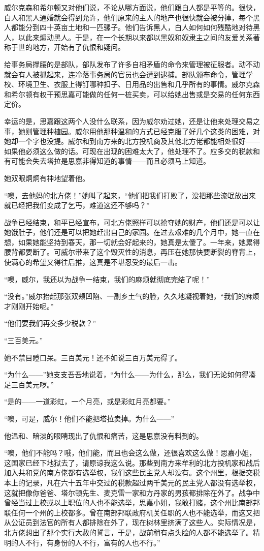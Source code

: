 \par 威尔克森和希尔顿又对他们说，不论从哪方面说，他们跟白人都是平等的。很快，白人和黑人通婚就会得到允许，他们原来的主人的地产也很快就会被分掉，每个黑人都能分到四十英亩土地和一匹骡子。他们告诉黑人，白人如何如何残酷地对待黑人，以此来煽动黑人。于是，在一个长期以来都以黑奴和奴隶主之间的友爱关系著称于世的地方，开始有了仇恨和疑问。
\par 给事务局撑腰的是部队，部队发布了许多自相矛盾的命令来管理被征服者。动不动就会有人被抓起来，连冷落事务局的官员也会遭到逮捕。部队颁布命令，管理学校、环境卫生、衣服上得钉哪种扣子、日用品的出售和几乎所有的事情。威尔克森和希尔顿有权干预思嘉可能做的任何一桩买卖，可以给她出售或是交易的任何东西定价。
\par 幸运的是，思嘉跟这两个人没什么联系，因为威尔劝过她，还是让他来处理交易之事，她则管理种植园。威尔用他那种温和的方式已经克服了好几个这类的困难，对她却一个字也没提。威尔和到南方来的北方投机商及其他北方佬都能相处很好——如果他必须这么做的话。可现在出现的困难太大了，他处理不了。应多交的税款和有可能会失去塔拉是思嘉非得知道的事情——而且必须马上知道。
\par 她双眼炯炯有神地望着他。
\par “噢，去他妈的北方佬！”她叫了起来，“他们把我们打败了，没把那些流氓放出来就已经把我们变成了乞丐，难道这还不够吗？”
\par 战争已经结束，和平已经宣布，可北方佬照样可以抢夺她的财产，他们还是可以让她饿肚子，他们还是可以把她赶出自己的家园。在过去艰难的几个月中，她一直在想，如果她能坚持到春天，那一切就会好起来的，她真是太傻了。一年来，她累得腰背都要断了。可威尔带来了这个毁灭性的消息，再压在她那快要断裂的脊背上，使满心的希望又得往后推，这真是不堪忍受的最后一击。
\par “噢，威尔，我还以为战争一结束，我们的麻烦就彻底完结了呢！”
\par “没有。”威尔抬起那张双颊凹陷、一副乡土气的脸，久久地凝视着她，“我们的麻烦才刚刚开始呢。”
\par “他们要我们再交多少税款？”
\par “三百美元。”
\par 她不禁目瞪口呆。三百美元！还不如说三百万美元得了。
\par “为什么——”她支支吾吾地说着，“为什么——为什么，那么，我们无论如何得凑足三百美元啰。”
\par “是的——一道彩虹，一个月亮，或是彩虹月亮都要。”
\par “噢，可是，威尔！他们不能把塔拉卖掉。为什么——”
\par 他温和、暗淡的眼睛现出了仇恨和痛苦，这是思嘉没有料到的。
\par “噢，他们不能吗？哦，他们能，而且也会这么做，还很喜欢这么做！思嘉小姐，这国家已经下地狱去了，请原谅我这么说。那些到南方来牟利的北方投机家和战后加入共和党的南方佬都有选举权，我们这些民主党人却没有。这个州里，根据交税本上的记录，凡在六十五年中交过的税款超过两千美元的民主党人都没有选举权，这就把像你爸爸、塔尔顿先生、麦克雷一家和方丹家的男孩都排除在外了。战争中曾经当过上校或以上职位的人也不能选举，思嘉小姐，我敢打赌，这个州比南部邦联任何一个州的上校都多。曾在南部邦联政府机关任职的人也不能选举，而这又把从公证员到法官的所有人都排除在外了，现在树林里挤满了这些人。实际情况是，北方佬想出了那个实行大赦的誓言，于是，战前稍有点头脸的人都不能选举了。精明的人不行，有身份的人不行，富有的人也不行。”

